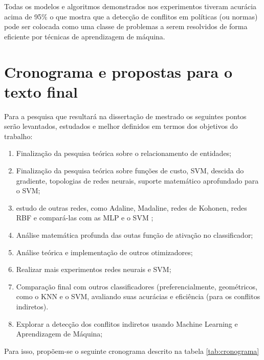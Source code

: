 Todas os modelos e algoritmos demonstrados nos experimentos tiveram acurácia acima de 95\% o que mostra que a detecção de conflitos em políticas (ou normas) pode ser colocada como uma classe de problemas a serem resolvidos de forma eficiente por técnicas de aprendizagem de máquina.
\clearpage
\chapter{Cronograma e propostas para o texto final}\label{propostas}
Para a pesquisa que resultará na dissertação de mestrado os seguintes pontos serão levantados, estudados e melhor definidos em termos dos objetivos do trabalho:
\begin{enumerate}
\item Finalização da pesquisa teórica sobre o relacionamento de entidades;
\item Finalização da pesquisa teórica sobre funções de custo, SVM, descida do gradiente, topologias de redes neurais, suporte matemático aprofundado para o SVM;
\item estudo de outras redes, como Adaline, Madaline, redes de Kohonen, redes RBF e compará-las com as MLP e o SVM ;
\item Análise matemática profunda das outas função de ativação no classificador;
\item Análise teórica e implementação de outros otimizadores;
\item Realizar mais experimentos redes neurais e SVM;
\item Comparação final com outros classificadores (preferencialmente, geométricos, como o KNN e o SVM, avaliando suas acurácias e eficiência (para os conflitos indiretos).
\item Explorar a detecção dos conflitos indiretos usando Machine Learning e Aprendizagem de Máquina;
\end{enumerate}
Para isso, propõem-se o seguinte cronograma descrito na tabela \ref{tab:cronograma}

